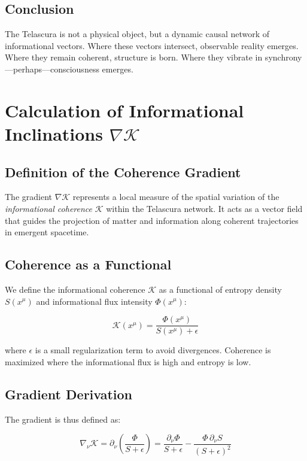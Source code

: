 \documentclass[12pt]{article}
\begin{document}
\subsection*{Conclusion}
The Telascura is not a physical object, but a dynamic causal network of informational vectors. Where these vectors intersect, observable reality emerges. Where they remain coherent, structure is born. Where they vibrate in synchrony—perhaps—consciousness emerges.
\section[Calculation of Informational Inclinations]{Calculation of Informational Inclinations $\nabla \mathcal{K}$}

\subsection*{Definition of the Coherence Gradient}
The gradient $\nabla \mathcal{K}$ represents a local measure of the spatial variation of the \textit{informational coherence} $\mathcal{K}$ within the Telascura network. It acts as a vector field that guides the projection of matter and information along coherent trajectories in emergent spacetime.

\subsection*{Coherence as a Functional}
We define the informational coherence $\mathcal{K}$ as a functional of entropy density $S(x^\mu)$ and informational flux intensity $\Phi(x^\mu)$:

\begin{equation}
\mathcal{K}(x^\mu) = \frac{\Phi(x^\mu)}{S(x^\mu) + \epsilon}
\end{equation}

where $\epsilon$ is a small regularization term to avoid divergences. Coherence is maximized where the informational flux is high and entropy is low.

\subsection*{Gradient Derivation}
The gradient is thus defined as:

\begin{equation}
\nabla_\nu \mathcal{K} = \partial_\nu \left( \frac{\Phi}{S + \epsilon} \right)
= \frac{\partial_\nu \Phi}{S + \epsilon} - \frac{\Phi \, \partial_\nu S}{(S + \epsilon)^2}
\end{equation}
\end{document}
